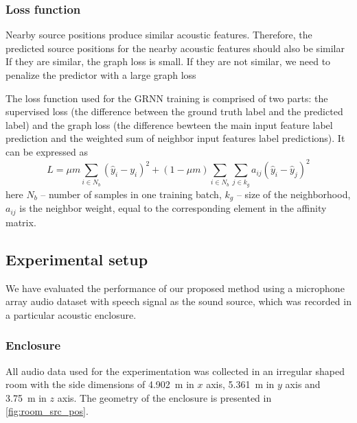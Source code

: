 \documentclass[applsci,article,submit,moreauthors,pdftex]{Definitions/mdpi}
\begin{document}
\subsubsection{Loss function}

Nearby source positions produce similar acoustic features. Therefore, the predicted source positions for the nearby acoustic features should also be similar
If they are similar, the graph loss is small. If they are not similar, we need to penalize the predictor with a large graph loss

The loss function used for the GRNN training is comprised of two parts: the supervised loss (the difference between the ground truth label and the predicted label) and the graph loss (the difference bewteen the main input feature label prediction and the weighted sum of neighbor input features label predictions). It can be expressed as 
\begin{equation}\label{eq:grnn_loss_function}
	L = \mu m \sum_{i \in N_{b}} (\hat{y}_i - y_i)^2  + (1-\mu m) \sum_{i \in N_{b}} \sum_{j \in k_g} a_{ij} (\hat{y}_i-\hat{y}_j)^2
\end{equation}
here $ N_b $ -- number of samples in one training batch, $ k_g $ -- size of the neighborhood, $ a_{ij} $ is the neighbor weight, equal to the corresponding element in the affinity matrix.


\subsection{Experimental setup}
We have evaluated the performance of our proposed method using a \realworld{} microphone array audio dataset with speech signal as the sound source, which was recorded in a particular acoustic enclosure.

\subsubsection{Enclosure}
All audio data used for the experimentation was collected in an irregular shaped room with the side dimensions of \SI{4.902}{\m} in $ x $ axis, \SI{5.361}{\m} in $ y $ axis and \SI{3.75}{\m} in $ z $ axis. The geometry of the enclosure is presented in \figurename{} \ref{fig:room_src_pos}. 
\end{document}
